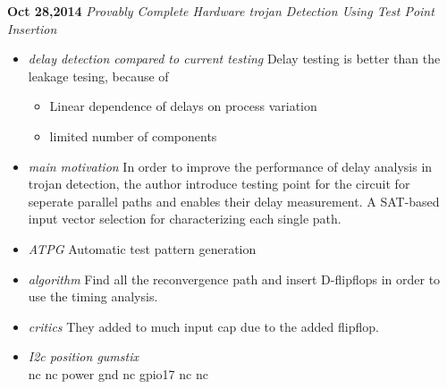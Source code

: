 \documentclass[]{article}
\begin{document}
\noindent \textbf{Oct 28,2014}
\textit{Provably Complete Hardware trojan Detection Using Test Point Insertion}
\indent		\begin{itemize}
            \item \textit{delay detection compared to current testing} Delay
            testing is better than the leakage tesing, because of 
                \begin{itemize}
                    \item Linear dependence of delays on process variation
                    \item limited number of components
                \end{itemize}
            \item \textit{main motivation} In order to improve the performance
            of delay analysis in trojan detection, the author introduce testing
            point for the circuit for seperate parallel paths and enables their
            delay measurement.  A SAT-based input vector selection for
            characterizing each single path.
            \item \textit{ATPG} Automatic test pattern generation
            \item \textit{algorithm} Find all the reconvergence path and insert
            D-flipflops in order to use the timing analysis.
            \item \textit{critics} They added to much input cap due to the
            added flipflop.
       		\end{itemize}
       		\begin{itemize}
                \item \textit{I2c position gumstix} \\
                nc nc power gnd
                nc gpio17 nc nc
       		\end{itemize}
\end{document}
